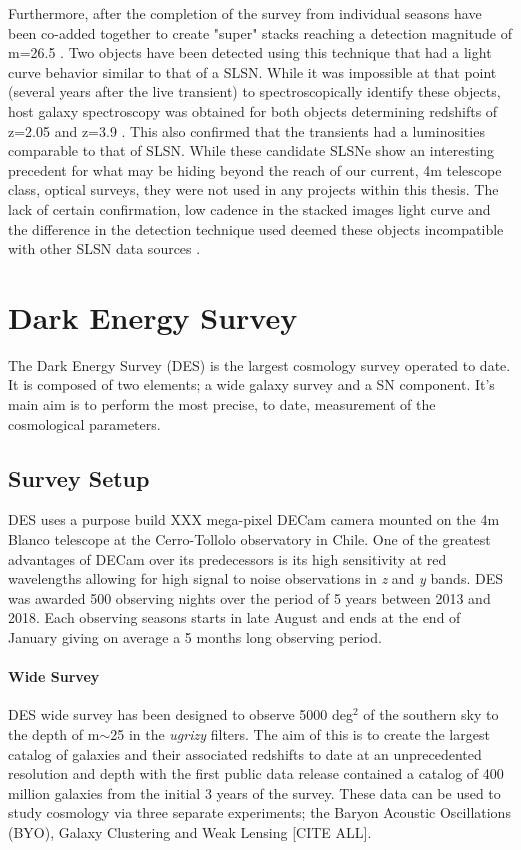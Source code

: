 Furthermore, after the completion of the survey from individual seasons have been co-added together to create "super" stacks reaching a detection magnitude of m=26.5 \citep{Cooke2012Superluminous3.90.}. Two objects have been detected using this technique that had a light curve behavior similar to that of a SLSN. While it was impossible at that point (several years after the live transient) to spectroscopically identify these objects, host galaxy spectroscopy was obtained for both objects determining redshifts of z=2.05 and z=3.9 \citep{Cooke2012Superluminous3.90.}. This also confirmed that the transients had a luminosities comparable to that of SLSN. While these candidate SLSNe show an interesting precedent for what may be hiding beyond the reach of our current, 4m telescope class, optical surveys, they were not used in any projects within this thesis. The lack of certain confirmation, low cadence in the stacked images light curve and the difference in the detection technique used deemed these objects incompatible with other SLSN data sources \citep{Prajs2017The1}.

\section{Dark Energy Survey}
The Dark Energy Survey (DES) is the largest cosmology survey operated to date. It is composed of two elements; a wide galaxy survey and a SN component. It's main aim is to perform the most precise, to date, measurement of the cosmological parameters.

\subsection{Survey Setup}
DES uses a purpose build XXX mega-pixel DECam camera mounted on the 4m Blanco telescope at the Cerro-Tollolo observatory in Chile. One of the greatest advantages of DECam over its predecessors is its high sensitivity at red wavelengths allowing for high signal to noise observations in \textit{z} and \textit{y} bands. DES was awarded 500 observing nights over the period of 5 years between 2013 and 2018. Each observing seasons starts in late August and ends at the end of January giving on average a 5 months long observing period.

\paragraph{Wide Survey}
DES wide survey has been designed to observe 5000 deg$^2$ of the southern sky to the depth of m$\sim$25 in the \textit{ugrizy} filters. The aim of this is to create the largest catalog of galaxies and their associated redshifts to date at an unprecedented resolution and depth with the first public data release contained a catalog of 400 million galaxies from the initial 3 years of the survey. These data can be used to study cosmology via three separate experiments; the Baryon Acoustic Oscillations (BYO), Galaxy Clustering and Weak Lensing [CITE ALL].

